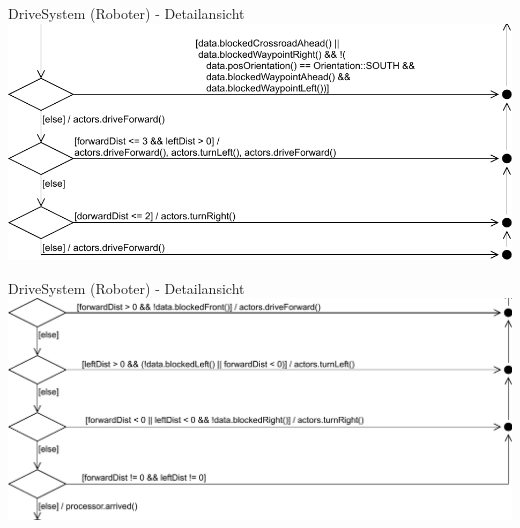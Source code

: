 \documentclass{beamer}
\begin{document}
\begin{frame}{DriveSystem (Roboter) - Detailansicht}
\centering
\includegraphics[width=\linewidth]{PDF/DriveSystem8.pdf}
\end{frame}
\begin{frame}{DriveSystem (Roboter) - Detailansicht}
\centering
\includegraphics[width=\linewidth]{PDF/DriveSystem9.pdf}
\end{frame}
\end{document}

